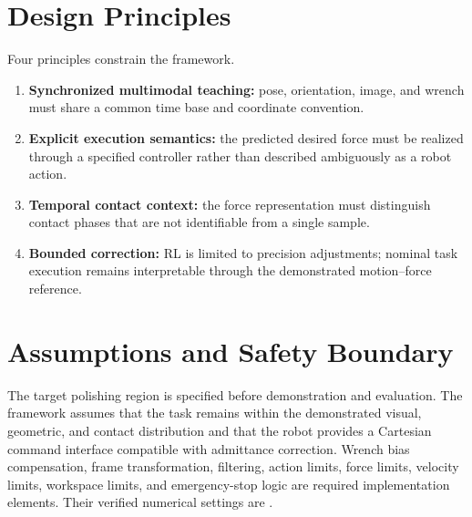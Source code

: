 \section{Design Principles}
Four principles constrain the framework.
\begin{enumerate}
  \item \textbf{Synchronized multimodal teaching:} pose, orientation, image, and wrench must share a common time base and coordinate convention.
  \item \textbf{Explicit execution semantics:} the predicted desired force must be realized through a specified controller rather than described ambiguously as a robot action.
  \item \textbf{Temporal contact context:} the force representation must distinguish contact phases that are not identifiable from a single sample.
  \item \textbf{Bounded correction:} RL is limited to precision adjustments; nominal task execution remains interpretable through the demonstrated motion--force reference.
\end{enumerate}

\section{Assumptions and Safety Boundary}
The target polishing region is specified before demonstration and evaluation. The framework assumes that the task remains within the demonstrated visual, geometric, and contact distribution and that the robot provides a Cartesian command interface compatible with admittance correction. Wrench bias compensation, frame transformation, filtering, action limits, force limits, velocity limits, workspace limits, and emergency-stop logic are required implementation elements. Their verified numerical settings are .
